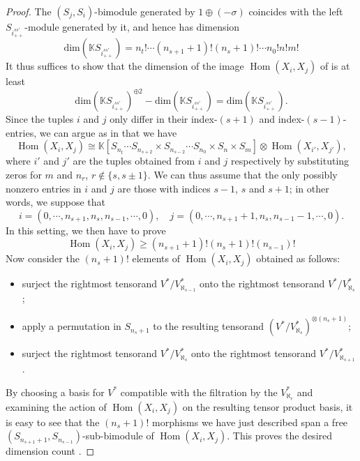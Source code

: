\documentclass[11pt]{article}
\theoremstyle{plain}
\theoremstyle{nonumberplain}
\theoremstyle{plain}
\theoremstyle{nonumberplain}
\newtheorem{proof}{Proof}
\newcommand\bK{\mathbb K}
\DeclareMathOperator{\Hom}{\mathrm{Hom}}
\begin{document}
\begin{proof}
  The $(S_j,S_i)$-bimodule generated by $1\oplus(-\sigma)$ coincides
  with the left $S_{i^{ss'}_{++}}$-module generated by it, and hence
  has dimension
  \begin{equation*}
    \mathrm{dim} \left(\bK S_{i^{ss'}_{++}}\right) = n_t!\cdots (n_{s+1}+1)! (n_s+1)!\cdots n_0!n!m!
  \end{equation*}
  It thus suffices to show that the dimension of the image
  $\Hom(X_i,X_j)$ of  is at least
  \begin{equation*}
    \mathrm{dim} \left(\bK S_{i^{ss'}_{++}}\right)^{\oplus 2}-\mathrm{dim} \left(\bK S_{i^{ss'}_{++}}\right) =
    \mathrm{dim} \left(\bK S_{i^{ss'}_{++}}\right).
  \end{equation*}
  Since the tuples $i$ and $j$ only differ in their index-$(s+1)$ and
  index-$(s-1)$-entries, we can argue as in 
  that we have
  \begin{equation*}
    \Hom(X_i,X_j)\cong \bK[S_{n_t}\cdots S_{n_{s+2}}\times S_{n_{s-2}}\cdots S_{n_0}\times S_{n}\times S_m]\otimes \Hom(X_{i'},X_{j'}),
  \end{equation*}
  where $i'$ and $j'$ are the tuples obtained from $i$ and $j$
  respectively by substituting zeros for $m$ and $n_r$,
  $r\not\in\{s,s\pm 1\}$. We can thus assume that the only possibly
  nonzero entries in $i$ and $j$ are those with indices $s-1$, $s$
  and $s+1$; in other words, we suppose that
  \begin{equation*}
    i=(0,\cdots,n_{s+1},n_s,n_{s-1},\cdots,0),\quad j=(0,\cdots,n_{s+1}+1,n_s,n_{s-1}-1,\cdots,0).
  \end{equation*}
  In this setting, we then have to prove
  \begin{equation}\label{eq:dim-ct}
    \Hom(X_i,X_j)\ge (n_{s+1}+1)! (n_{s}+1)! (n_{s-1})!
  \end{equation}
  Now consider the $(n_s+1)!$ elements of $\Hom(X_i,X_j)$ obtained as
  follows:
  \begin{itemize}
  \item surject the rightmost tensorand $V^*/V^*_{\aleph_{s-1}}$ onto the rightmost tensorand $V^*/V^*_{\aleph_s}$;
  \item apply a permutation in $S_{n_s+1}$ to the resulting tensorand $(V^*/V^*_{\aleph_s})^{\otimes (n_s+1)}$;
  \item surject the rightmost tensorand $V^*/V^*_{\aleph_{s}}$ onto the
    rightmost tensorand $V^*/V^*_{\aleph_{s+1}}$.
  \end{itemize}
  By choosing a basis for $V^*$ compatible with the filtration by the
  $V^*_{\aleph_r}$ and examining the action of $\Hom(X_i,X_j)$ on the
  resulting tensor product basis, it is easy to see that the
  $(n_s+1)!$ morphisms we have just described span a free
  $(S_{n_{s+1}+1},S_{n_{s-1}})$-sub-bimodule of $\Hom(X_i,X_j)$. This
  proves the desired dimension count .
\end{proof}
\end{document}
